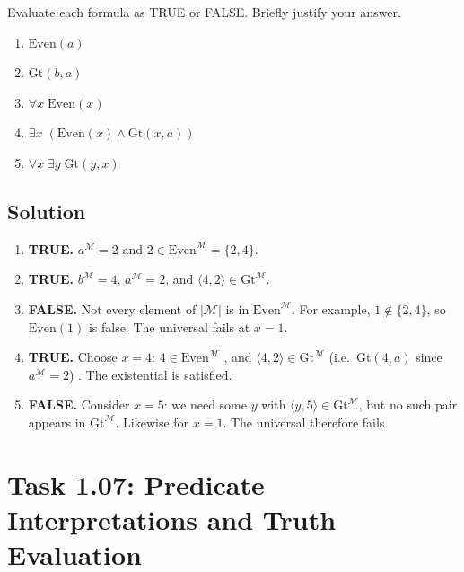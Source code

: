 \documentclass[11pt,a4paper]{article}
\newenvironment{solution}{%
    \begin{tcolorbox}[
        breakable,
        colback=green!4,
        colframe=green!50!black,
        fonttitle=\bfseries,
        title={ Solution},
        left=6pt, right=6pt, top=4pt, bottom=4pt
    ]%
    }{%
    \end{tcolorbox}%
}
\begin{document}
    Evaluate each formula as TRUE or FALSE. Briefly justify your answer.

    \begin{enumerate}[label=(\alph*)]
        \item $\mathrm{Even}(a)$
        \item $\mathrm{Gt}(b,a)$
        \item $\forall x\;\mathrm{Even}(x)$
        \item $\exists x\;(\mathrm{Even}(x) \land \mathrm{Gt}(x,a))$
        \item $\forall x\;\exists y\;\mathrm{Gt}(y,x)$
    \end{enumerate}

    \subsection*{Solution}
    \begin{solution}
        \begin{enumerate}[label=(\alph*)]
            \item \textbf{TRUE.} $a^{\mathcal{M}} = 2$ and $2 \in \mathrm{Even}^{\mathcal{M}} = \{2,4\}$.

            \item \textbf{TRUE.} $b^{\mathcal{M}} = 4$, $a^{\mathcal{M}} = 2$, and $\langle 4,2\rangle \in \mathrm{Gt}^{\mathcal{M}}$.

            \item \textbf{FALSE.} Not every element of $|\mathcal{M}|$ is in $\mathrm{Even}^{\mathcal{M}}$. For example, $1 \notin \{2,4\}$, so $\mathrm{Even}(1)$ is false. The universal fails at $x = 1$.

            \item \textbf{TRUE.} Choose $x = 4$: $4 \in \mathrm{Even}^{\mathcal{M}}$ \checkmark, and $\langle 4,2\rangle \in \mathrm{Gt}^{\mathcal{M}}$ (i.e.\ $\mathrm{Gt}(4,a)$ since $a^{\mathcal{M}}=2$) \checkmark. The existential is satisfied.

            \item \textbf{FALSE.} Consider $x = 5$: we need some $y$ with $\langle y, 5\rangle \in \mathrm{Gt}^{\mathcal{M}}$, but no such pair appears in $\mathrm{Gt}^{\mathcal{M}}$. Likewise for $x = 1$. The universal therefore fails.
        \end{enumerate}
    \end{solution}


    \section*{Task 1.07: Predicate Interpretations and Truth Evaluation}
\end{document}
